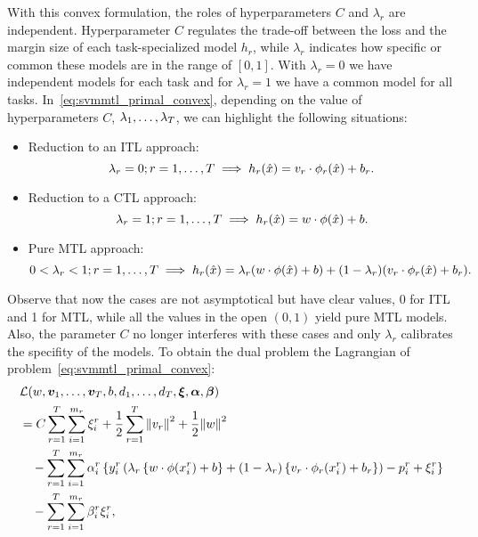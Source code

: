With this convex formulation, the roles of hyperparameters $C$ and $\lambda_r$ are independent. Hyperparameter $C$ regulates the trade-off between the loss and the margin size of each task-specialized model $h_r$, while $\lambda_r$ indicates how specific or common these models are in the range of $[0, 1]$. With $\lambda_r=0$ we have independent models for each task and for $\lambda_r=1$ we have a common model for all tasks. 
%
In~\eqref{eq:svmmtl_primal_convex}, depending on the value of hyperparameters $C$, $\lambda_1, \ldots, \lambda_T$, we can highlight the following situations:
%
\begin{itemize}
    \item Reduction to an ITL approach:
    $$\lambda_r = 0 ; r=1, \ldots, T \implies h_r(\hat{x}) = {v}_r \cdot \phi_r(\hat{x}) + b_r .$$
    \item Reduction to a CTL approach: 
    $$ \lambda_r = 1 ; r=1, \ldots, T \implies h_r(\hat{x}) = {w} \cdot \phi(\hat{x}) + b .$$
    \item Pure MTL approach:
    $$ 0 < \lambda_r < 1 ; r=1, \ldots, T \implies h_r(\hat{x}) = \lambda_r ({w} \cdot \phi(\hat{x}) + b ) + (1 - \lambda_r) ({v}_r \cdot \phi_r(\hat{x}) + b_r) .$$
\end{itemize}
Observe that now the cases are not asymptotical but have clear values, 0 for ITL and 1 for MTL, while all the values in the open $(0, 1)$ yield pure MTL models. Also, the parameter $C$ no longer interferes with these cases and only $\lambda_r$ calibrates the specifity of the models.
 To obtain the dual problem the Lagrangian of problem~\eqref{eq:svmmtl_primal_convex}:
\begin{equation}\label{eq:svmmtl_lagrangian_convex}
    \begin{aligned}
        & \lagr({w}, \fv{v}_1, \ldots, \fv{v}_\ntasks, b, d_1, \ldots, d_\ntasks, \fv{\xi}, \fv{\alpha}, \fv{\beta}) \\
        &=  C \sum_{r= 1}^T \sum_{i=1}^{m_r} {\xi_{i}^r} + \frac{1}{2} \sum_{r= 1}^T{\norm{{v}_r}^2} + \frac{1}{2} {\norm{{w}}}^2 \\
        &\quad -  \sum_{r= 1}^T \sum_{i=1}^{m_r} \alpha_i^r \left\lbrace y_{i}^r  \left(\lambda_r \left\lbrace {w} \cdot \phi(x_{i}^r) + b  \right\rbrace + (1 - \lambda_r) \left\lbrace {v}_r \cdot \phi_r(x_{i}^r) + b_r \right\rbrace  \right) - p_{i}^r + \xi_{i}^r  \right\rbrace \\
        &\quad -  \sum_{r= 1}^T \sum_{i=1}^{m_r} \beta_i^r \xi_i^r ,
    \end{aligned}
\end{equation}
